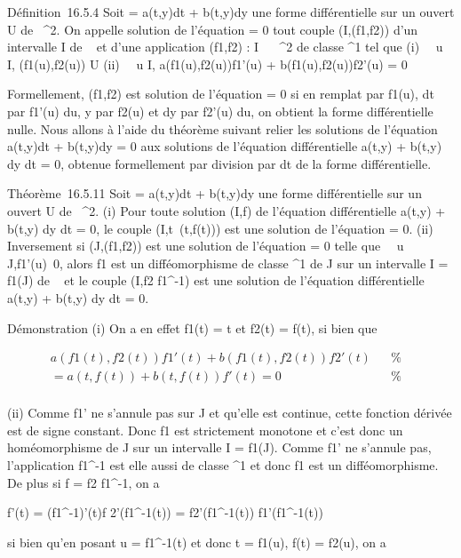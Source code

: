 Définition~16.5.4 Soit \omega = a(t,y)dt + b(t,y)dy une forme différentielle
sur un ouvert U de ~^2. On appelle solution de l'équation \omega =
0 tout couple (I,(f1,f2)) d'un intervalle I de ~ et
d'une application (f1,f2) : I \rightarrow~ ~^2 de
classe ^1 tel que (i) \forall~~u \in I,
(f1(u),f2(u)) \in U (ii) \forall~~u
\in I, a(f1(u),f2(u))f1'(u) +
b(f1(u),f2(u))f2'(u) = 0

Formellement, (f1,f2) est solution de l'équation \omega =
0 si en rempla\ccant t par f1(u), dt par
f1'(u) du, y par f2(u) et dy par f2'(u)
du, on obtient la forme différentielle nulle. Nous allons à l'aide du
théorème suivant relier les solutions de l'équation a(t,y)dt + b(t,y)dy
= 0 aux solutions de l'équation différentielle a(t,y) + b(t,y) dy
\over dt = 0, obtenue formellement par division par dt
de la forme différentielle.

Théorème~16.5.11 Soit \omega = a(t,y)dt + b(t,y)dy une forme différentielle
sur un ouvert U de ~^2. (i) Pour toute solution (I,f) de
l'équation différentielle a(t,y) + b(t,y) dy \over dt
= 0, le couple (I,t\mapsto~(t,f(t))) est une
solution de l'équation \omega = 0. (ii) Inversement si
(J,(f1,f2)) est une solution de l'équation \omega = 0
telle que \forall~~u \in
J,f1'(u)\neq~0, alors f1 est
un difféomorphisme de classe ^1 de J sur un intervalle I =
f1(J) de ~ et le couple (I,f2 \cdot
f1^-1) est une solution de l'équation différentielle
a(t,y) + b(t,y) dy \over dt = 0.

Démonstration (i) On a en effet f1(t) = t et f2(t) =
f(t), si bien que

\begin{align*}
a(f1(t),f2(t))f1'(t) +
b(f1(t),f2(t))f2'(t)& & \%&
\\ = a(t,f(t)) + b(t,f(t))f'(t) = 0& &
\%& \\ \end{align*}

(ii) Comme f1' ne s'annule pas sur J et qu'elle est continue,
cette fonction dérivée est de signe constant. Donc f1 est
strictement monotone et c'est donc un homéomorphisme de J sur un
intervalle I = f1(J). Comme f1' ne s'annule pas,
l'application f1^-1 est elle aussi de classe
^1 et donc f1 est un difféomorphisme. De plus si f
= f2 \cdot f1^-1, on a

f'(t) = \left
(f1^-1\right )'(t)f
2'(f1^-1(t)) =
f2'(f1^-1(t)) \over
f1'(f1^-1(t))

si bien qu'en posant u = f1^-1(t) et donc t =
f1(u), f(t) = f2(u), on a


